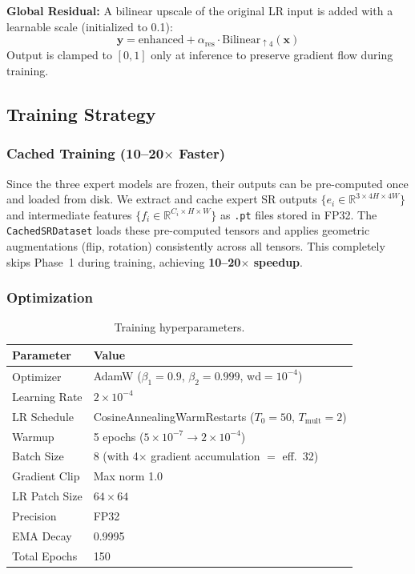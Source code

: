 \documentclass[10pt,twocolumn,letterpaper]{article}
\begin{document}
\noindent\textbf{Global Residual:} A bilinear upscale of the original LR input is added with a learnable scale (initialized to 0.1):
\begin{equation}
\mathbf{y} = \text{enhanced} + \alpha_{\text{res}} \cdot \text{Bilinear}_{\uparrow 4}(\mathbf{x})
\end{equation}
Output is clamped to $[0,1]$ only at inference to preserve gradient flow during training.

\subsection{Training Strategy}

\subsubsection{Cached Training (10--20$\times$ Faster)}

Since the three expert models are frozen, their outputs can be pre-computed once and loaded from disk. We extract and cache expert SR outputs $\{e_i \in \mathbb{R}^{3 \times 4H \times 4W}\}$ and intermediate features $\{f_i \in \mathbb{R}^{C_i \times H \times W}\}$ as \texttt{.pt} files stored in FP32. The \texttt{CachedSRDataset} loads these pre-computed tensors and applies geometric augmentations (flip, rotation) consistently across all tensors. This completely skips Phase~1 during training, achieving \textbf{10--20$\times$ speedup}.

\subsubsection{Optimization}

\begin{table}[h]
\centering
\small
\begin{tabular}{@{}ll@{}}
\toprule
\textbf{Parameter} & \textbf{Value} \\
\midrule
Optimizer & AdamW ($\beta_1\!=\!0.9$, $\beta_2\!=\!0.999$, wd$\!=\!10^{-4}$) \\
Learning Rate & $2 \times 10^{-4}$ \\
LR Schedule & CosineAnnealingWarmRestarts ($T_0\!=\!50$, $T_\text{mult}\!=\!2$) \\
Warmup & 5 epochs ($5\!\times\!10^{-7} \to 2\!\times\!10^{-4}$) \\
Batch Size & 8 (with 4$\times$ gradient accumulation $=$ eff.\ 32) \\
Gradient Clip & Max norm 1.0 \\
LR Patch Size & $64 \times 64$ \\
Precision & FP32 \\
EMA Decay & 0.9995 \\
Total Epochs & 150 \\
\bottomrule
\end{tabular}
\caption{Training hyperparameters.}
\label{tab:training}
\end{table}
\end{document}

